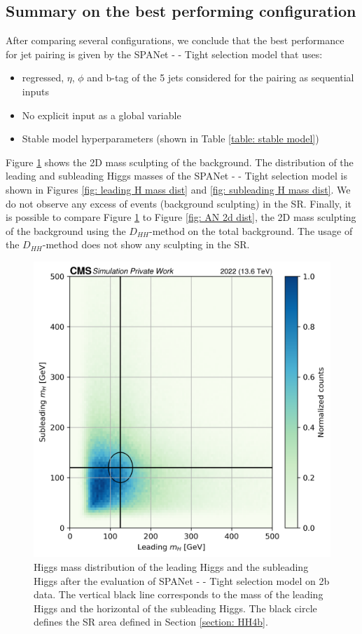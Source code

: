 \subsection{Summary on the best performing configuration} \label{subsection: Optimal config}
After comparing several configurations, we conclude that the best performance for jet pairing is given by the SPANet - \kl - Tight selection model that uses:
\begin{itemize}
    \item \pt regressed, $\eta$, $\phi$ and b-tag of the 5 jets considered for the pairing as sequential inputs
    \item No explicit \kl input as a global variable
    \item Stable model hyperparameters (shown in Table \ref{table: stable model})
\end{itemize}
Figure \ref{fig: 2D mass dist kl} shows the 2D mass sculpting of the background. The distribution of the leading and subleading Higgs masses of the SPANet - \kl - Tight selection model is shown in Figures \ref{fig: leading H mass dist} and \ref{fig: subleading H mass dist}. We do not observe any excess of events (background sculpting) in the SR. Finally, it is possible to compare Figure \ref{fig: 2D mass dist kl} to Figure \ref{fig: AN 2d dist}, the 2D mass sculpting of the background using the $D_{HH}$-method on the total background. The usage of the $D_{HH}$-method does not show any sculpting in the SR.


\begin{figure}[hbt]
    \centering
    \includegraphics[width=0.6\linewidth]{Images/6.Improving/kappa lambda/mass dist best model.png}
    \caption{Higgs mass distribution of the leading Higgs and the subleading Higgs after the evaluation of  SPANet - \kl - Tight selection model on 2b data. The vertical black line corresponds to the mass of the leading Higgs and the horizontal of the subleading Higgs. The black circle defines the SR area defined in Section \ref{section: HH4b}.}
    \label{fig: 2D mass dist kl}
\end{figure}

